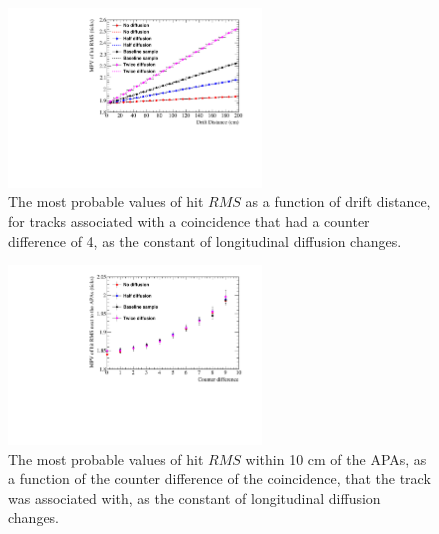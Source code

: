 \begin{figure}[h!]
  \centering
  \includegraphics[width=0.6\textwidth]{Canvas_CountDiff4_All_Positions_Diffusion}
  \caption[The drift distance dependence of diffusion in the 35 ton dataset and Monte Carlo for coincidences with a counter difference of 4, as the constant of longitudinal diffusion changes]
          {The most probable values of hit $RMS$ as a function of drift distance, for tracks associated with a coincidence that had a counter difference of 4, as the constant of longitudinal diffusion changes.}
  \label{fig:DiffLDiff_CDiff4}
\end{figure}

\begin{figure}[h!]
  \centering
  \includegraphics[width=0.6\textwidth]{Canvas_All_Angles_RMS0cm_Diffusion}
  \caption[The angular dependence of diffusion in the 35 ton dataset and Monte Carlo for hits within 10 cm of the APAs, as the constant of longitudinal changes]
          {The most probable values of hit $RMS$ within 10 cm of the APAs, as a function of the counter difference of the coincidence, that the track was associated with, as the constant of longitudinal diffusion changes.}
  \label{fig:DiffLDiff_RMS0cm}
\end{figure}

